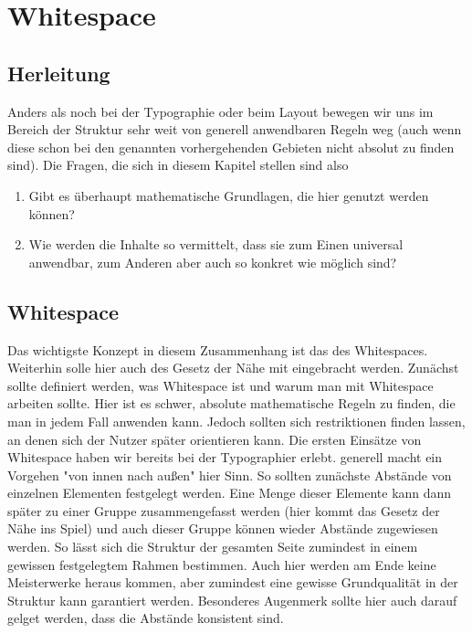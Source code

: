 
\chapter{Whitespace} %

\label{Whitespace} %



\section{Herleitung}

Anders als noch bei der Typographie oder beim Layout bewegen wir uns im Bereich der Struktur sehr weit von generell anwendbaren Regeln weg (auch wenn diese schon bei den genannten vorhergehenden Gebieten nicht absolut zu finden sind). Die Fragen, die sich in diesem Kapitel stellen sind also
\begin{enumerate}
 \item Gibt es überhaupt mathematische Grundlagen, die hier genutzt werden können?
 \item Wie werden die Inhalte so vermittelt, dass sie zum Einen universal anwendbar, zum Anderen aber auch so konkret wie möglich sind?
\end{enumerate}


\section{Whitespace}

Das wichtigste Konzept in diesem Zusammenhang ist das des Whitespaces. Weiterhin solle hier auch des Gesetz der Nähe mit eingebracht werden. Zunächst sollte definiert werden, was Whitespace ist und warum man mit Whitespace arbeiten sollte.
Hier ist es schwer, absolute mathematische Regeln zu finden, die man in jedem Fall anwenden kann. Jedoch sollten sich restriktionen finden lassen, an denen sich der Nutzer später orientieren kann.
Die ersten Einsätze von Whitespace haben wir bereits bei der Typographier erlebt. generell macht ein Vorgehen "von innen nach außen" hier Sinn. So sollten zunächste Abstände von einzelnen Elementen festgelegt werden. Eine Menge dieser Elemente kann dann später zu einer Gruppe zusammengefasst werden (hier kommt das Gesetz der Nähe ins Spiel) und auch dieser Gruppe können wieder Abstände zugewiesen werden. So lässt sich die Struktur der gesamten Seite zumindest in einem gewissen festgelegtem Rahmen bestimmen.
Auch hier werden am Ende keine Meisterwerke heraus kommen, aber zumindest eine gewisse Grundqualität in der Struktur kann garantiert werden. Besonderes Augenmerk sollte hier auch darauf gelget werden, dass die Abstände konsistent sind.

